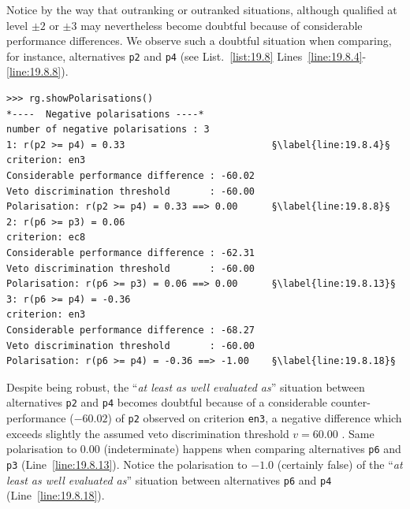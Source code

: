 Notice by the way that outranking or outranked situations, although qualified at level $\pm 2$ or $\pm 3$ may nevertheless become doubtful because of considerable performance differences. We observe such a doubtful situation when comparing, for instance, alternatives \texttt{p2} and \texttt{p4} (see List.~\vref{list:19.8} Lines~\ref{line:19.8.4}-\ref{line:19.8.8}).
\begin{lstlisting}[caption={Inspecting polarised outranking situations},label=list:19.8,basicstyle=\ttfamily\scriptsize]
>>> rg.showPolarisations()
*----  Negative polarisations ----*
number of negative polarisations : 3 
1: r(p2 >= p4) = 0.33                          §\label{line:19.8.4}§
criterion: en3
Considerable performance difference : -60.02
Veto discrimination threshold       : -60.00
Polarisation: r(p2 >= p4) = 0.33 ==> 0.00      §\label{line:19.8.8}§
2: r(p6 >= p3) = 0.06
criterion: ec8
Considerable performance difference : -62.31
Veto discrimination threshold       : -60.00
Polarisation: r(p6 >= p3) = 0.06 ==> 0.00      §\label{line:19.8.13}§
3: r(p6 >= p4) = -0.36
criterion: en3
Considerable performance difference : -68.27
Veto discrimination threshold       : -60.00
Polarisation: r(p6 >= p4) = -0.36 ==> -1.00    §\label{line:19.8.18}§
\end{lstlisting}

Despite being robust, the ``\emph{at least as well evaluated as}'' situation between alternatives \texttt{p2} and \texttt{p4} becomes doubtful because of a considerable counter-performance ($-60.02$) of \texttt{p2} observed on criterion \texttt{en3}, a negative difference which exceeds slightly the assumed veto discrimination threshold $v = 60.00$ . Same polarisation to $0.00$ (indeterminate) happens when comparing alternatives \texttt{p6} and \texttt{p3} (Line~\ref{line:19.8.13}). Notice the polarisation to $-1.0$ (certainly false) of the ``\emph{at least as well evaluated as}'' situation between alternatives \texttt{p6} and \texttt{p4} (Line~\ref{line:19.8.18}).  

